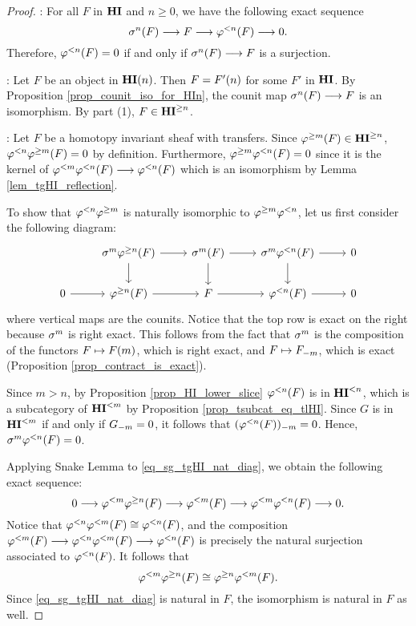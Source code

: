 \begin{proof}
 : For all $F$ in $\HI$ and $n \geq 0$, we have the 
following exact sequence
\[
\sgHI{n}(F) \to F \to \tlHI{n}(F) \to 0.
\]
Therefore, $\tlHI{n}(F) = 0$ if and only if $\sgHI{n}(F) 
\to F$ is a surjection.

 : Let $F$ be an object in $\HI(n)$. Then $F =
\LHI[n]{F'}$ for some $F'$ in $\HI$. By Proposition
\ref{prop_counit_iso_for_HIn}, the counit map $\sgHI{n}(F) \to F$ is
an isomorphism.  By part (1), $F \in \THI{n}$.

 : Let $F$ be a homotopy invariant sheaf with 
transfers. Since $\tgHI{m}(F) \in \THI{n}$, $\tlHI{n} \tgHI{m}(F) 
= 0$ by definition. Furthermore, $\tgHI{m}\tlHI{n}(F) = 0$ since 
it is the kernel of $\tlHI{m} \tlHI{n}(F) \to \tlHI{n}(F)$ 
which is an isomorphism by Lemma \ref{lem_tgHI_reflection}.

To show that $\tlHI{n} \tgHI{m}$ is naturally isomorphic to
$\tgHI{m} \tlHI{n}$, let us first consider the following 
diagram:
\begin{equation}\label{eq_sg_tgHI_nat_diag}
\begin{tikzcd}
{} &
\sgHI{m} \tgHI{n}(F) \arrow{r} \arrow{d} &
\sgHI{m}(F) \arrow{r} \arrow{d} &
\sgHI{m} \tlHI{n}(F) \arrow{r} \arrow{d} &
0 \\
0 \arrow{r} &
\tgHI{n}(F) \arrow{r} &
F \arrow{r} &
\tlHI{n}(F) \arrow{r}&
0
\end{tikzcd}
\end{equation}
where vertical maps are the counits. Notice that the top row is 
exact on the right because $\sgHI{m}$ is right exact. This follows 
from the fact that $\sgHI{m}$ is the composition of the functors 
$F \mapsto \LHI[m]{F}$, which is right exact, and $F \mapsto 
\RHI[m]{F}$, which is exact (Proposition \ref{prop_contract_is_exact}).

Since $m > n$, by Proposition \ref{prop_HI_lower_slice} 
$\tlHI{n}(F)$ is in $\TFHI{n}$, which is a subcategory of $\TFHI{m}$
by Proposition \ref{prop_tsubcat_eq_tlHI}. Since $G$ is in $\TFHI{m}$
if and only if $\RHI[m]{G} = 0$, it follows that 
$\RHI[m]{(\tlHI{n}(F))} = 0$. Hence, $\sgHI{m}\tlHI{n}(F) = 0$. 

Applying Snake Lemma to \eqref{eq_sg_tgHI_nat_diag}, we obtain the 
following exact sequence:
\begin{equation}\label{eq_tlHI_exact_sequence}
0 \to \tlHI{m}\tgHI{n}(F) \to \tlHI{m}(F) \to \tlHI{m} \tlHI{n}(F) 
   \to 0.
\end{equation}
Notice that $\tlHI{n} \tlHI{m}(F) \cong \tlHI{n}(F)$, and the 
composition $\tlHI{m}(F) \to \tlHI{n}\tlHI{m} (F) \to \tlHI{n}(F)$ 
is precisely the natural surjection associated to $\tlHI{n}(F)$. It 
follows that
\[
\tlHI{m} \tgHI{n}(F) \cong \tgHI{n} \tlHI{m}(F).
\]
Since \eqref{eq_sg_tgHI_nat_diag} is natural in $F$, the isomorphism
is natural in $F$ as well.


\end{proof}
